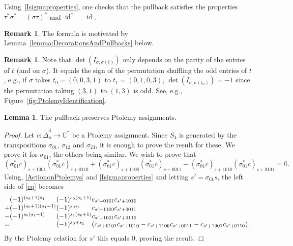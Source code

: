 \documentclass[12pt]{amsart}
\theoremstyle{definition}
\newtheorem{lemma}[theorem]{Lemma}
\newtheorem{remark}[theorem]{Remark}
\numberwithin{equation}{section}
\DeclareMathOperator{\id}{id}
\def\C{\mathbb{C}}
\begin{document}
Using~\eqref{Isigmaproperties}, one checks that the pullback satisfies the properties $\tau^*\sigma^*=(\sigma\tau)^*$ and $\id^*=\id$.

\begin{remark}
The formula is motivated by Lemma~\ref{lemma:DecorationsAndPullbacks} below.
\end{remark}

\begin{remark}\label{rm:ShuffleOdd}
Note that  $\det(I_{\sigma,\sigma(t)})$ only depends on the parity of the entries of $t$ (and on $\sigma$). It equals the sign of the permutation shuffling the odd entries of $t$, e.g., if $\sigma$ takes $t_0=(0,0,3,1)$ to $t_1=(0,1,0,3)$,  $\det(I_{\sigma,\sigma(t_0)})=-1$ since the permutation taking $(3,1)$ to $(1,3)$ is odd. See, e.g.,  Figure~\ref{fig:PtolemyIdentification}.
\end{remark}

\begin{lemma}\label{lemma:PtolemySymmetries}
The pullback preserves Ptolemy assignments.
\end{lemma}

\begin{proof}
Let $c\colon\dot\Delta^3_n\to\C^*$ be a Ptolemy assignment. Since $S_4$ is generated by the transpositions $\sigma_{01}$, $\sigma_{12}$ and $\sigma_{23}$, it is enough to prove the result for these. We prove it for $\sigma_{01}$, the others being similar. We wish to prove that
\begin{equation}\label{eq}
(\sigma_{01}^* c)_{s+1001}(\sigma_{01}^* c)_{s+0110}+(\sigma_{01}^* c)_{s+1100}(\sigma_{01}^* c)_{s+0011}-(\sigma_{01}^* c)_{s+1010}(\sigma_{01}^* c)_{s+0101}=0.
\end{equation}
Using, \eqref{ActiononPtolemys} and \eqref{Isigmaproperties} and letting $s'=\sigma_{01}s$, the left side of \eqref{eq} becomes
\begin{equation}\setlength\arraycolsep{0.01em}\label{eq:PullbackPtolemy}
\begin{array}{llll}
&(-1)^{(s_0+1)s_1} & (-1)^{s_0(s_1+1)} & c_{s'+0101}c_{s'+1010}\\
+&(-1)^{(s_0+1)(s_1+1)} & (-1)^{s_0s_1} & c_{s'+1100} c_{s'+0011}\\
-&(-1)^{s_0(s_1+1)} & (-1)^{s_1(s_0+1)} & c_{s'+1001}c_{s'+0110}\\
= && (-1)^{s_0+s_1} & \left(c_{s'+0101}c_{s'+1010}-c_{s'+1100} c_{s'+0011}-c_{s'+1001}c_{s'+0110}\right).
\end{array}
\end{equation}
By the Ptolemy relation for $s'$ this equals $0$, proving the result.
\end{proof}
\end{document}
